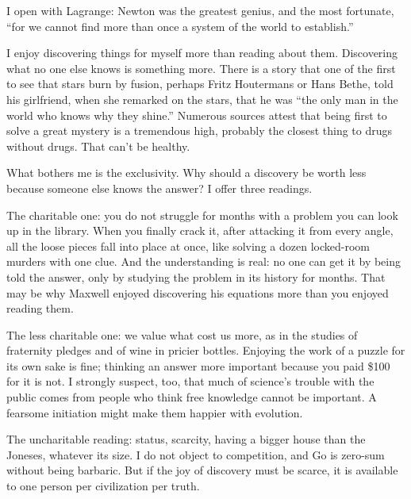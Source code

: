 
I open with Lagrange: Newton was the greatest genius, and the most fortunate, ``for we cannot find more than once a system of the world to establish.''

I enjoy discovering things for myself more than reading about them. Discovering what no one else knows is something more. There is a story that one of the first to see that stars burn by fusion, perhaps Fritz Houtermans or Hans Bethe, told his girlfriend, when she remarked on the stars, that he was ``the only man in the world who knows why they shine.'' Numerous sources attest that being first to solve a great mystery is a tremendous high, probably the closest thing to drugs without drugs. That can't be healthy. 

What bothers me is the exclusivity. Why should a discovery be worth less because someone else knows the answer? I offer three readings.

The charitable one: you do not struggle for months with a problem you can look up in the library. When you finally crack it, after attacking it from every angle, all the loose pieces fall into place at once, like solving a dozen locked-room murders with one clue. And the understanding is real: no one can get it by being told the answer, only by studying the problem in its history for months. That may be why Maxwell enjoyed discovering his equations more than you enjoyed reading them.

The less charitable one: we value what cost us more, as in the studies of fraternity pledges and of wine in pricier bottles. Enjoying the work of a puzzle for its own sake is fine; thinking an answer more important because you paid \$100 for it is not.  I strongly suspect, too, that much of science's trouble with the public comes from people who think free knowledge cannot be important. A fearsome initiation might make them happier with evolution.

The uncharitable reading: status, scarcity, having a bigger house than the Joneses, whatever its size. I do not object to competition, and Go is zero-sum without being barbaric. But if the joy of discovery must be scarce, it is available to one person per civilization per truth.

